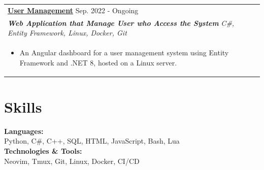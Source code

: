 \documentclass[a4paper,8pt]{article}
\begin{document}
\begin{tabularx}{\linewidth}{ @{}l r@{} }
\color[HTML]{1C033C} \textbf{\uline{\href{https://user-management.simanga.dev}{User Management}}} \hfill \color[HTML]{371e77} Sep. 2022 - Ongoing \\[4pt]
\color[HTML]{371e77}\textbf{\textit{Web Application that Manage User who Access the System}} \hfill \color[HTML]{4B28A4} \textit{C\#, Entity Framework, Linux, Docker, Git} \\[5pt]
\begin{minipage}[t]{\linewidth}
    \begin{itemize}[nosep,after=\strut, leftmargin=2em, itemsep=2pt]
        \item An Angular dashboard for a user management system using Entity Framework and .NET 8, hosted on a Linux server.
    \end{itemize}
    \end{minipage}
\end{tabularx}


\section{Skills}
\color[HTML]{1C033C}\textbf{Languages:} \\[2pt]
\color[HTML]{371e77} \hspace*{4ex} Python, C\#, C++, SQL, HTML, JavaScript, Bash, Lua\\[3pt]
\color[HTML]{1C033C}\textbf{Technologies \& Tools:} \\[2pt]
\color[HTML]{371e77} \hspace*{4ex} Neovim, Tmux, Git, Linux, Docker, CI/CD
\end{document}
